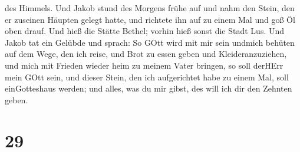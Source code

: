 des Himmels.  Und Jakob stund des Morgens frühe auf und
nahm den Stein, den er zuseinen Häupten gelegt hatte, und richtete ihn
auf zu einem Mal und goß Öl oben drauf.  Und hieß die
Stätte Bethel; vorhin hieß sonst die Stadt Lus.  Und Jakob
tat ein Gelübde und sprach: So GOtt wird mit mir sein undmich behüten
auf dem Wege, den ich reise, und Brot zu essen geben und
Kleideranzuziehen,  und mich mit Frieden wieder heim zu
meinem Vater bringen, so soll derHErr mein GOtt sein,  und
dieser Stein, den ich aufgerichtet habe zu einem Mal, soll einGotteshaus
werden; und alles, was du mir gibst, des will ich dir den Zehnten geben.

\hypertarget{section-28}{%
\section{29}\label{section-28}}

